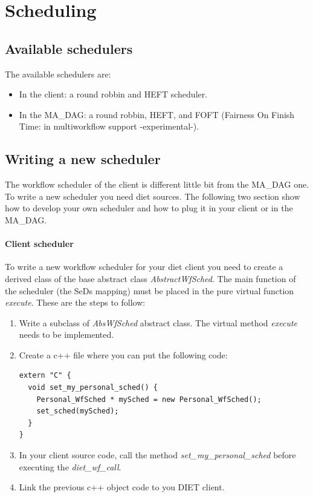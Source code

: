 \section{Scheduling}


\subsection{Available schedulers}

The available schedulers are:

\begin{itemize}
\item In the client: a round robbin and HEFT scheduler.
\item In the MA\_DAG: a round robbin, HEFT, and FOFT (Fairness On
  Finish Time: in multiworkflow support -experimental-).
\end{itemize}

\subsection{Writing a new scheduler}

The workflow scheduler of the client is different little bit from the
MA\_DAG one. To write a new scheduler you need diet sources. The
following two section show how to develop your own scheduler and how
to plug it in your client or in the MA\_DAG.

\paragraph{Client scheduler}

To write a new workflow scheduler for your diet client you need to
create a derived class of the base abstract class
\textit{AbstractWfSched}. The main function of the scheduler (the SeDs
mapping) must be placed in the pure virtual function \textit{execute}.
These are the steps to follow:

\begin{enumerate}
\item Write a subclass of \textit{AbsWfSched} abstract class. The
  virtual method \textit{execute} needs to be implemented.
\item Create a c++ file where you can put the following code:
\begin{verbatim}
extern "C" {
  void set_my_personal_sched() {
    Personal_WfSched * mySched = new Personal_WfSched();
    set_sched(mySched);
  }
}
\end{verbatim}
\item In your client source code, call the method
  \textit{set\_my\_personal\_sched} before executing the
  \textit{diet\_wf\_call}.
\item Link the previous c++ object code to you DIET client.
\end{enumerate}

